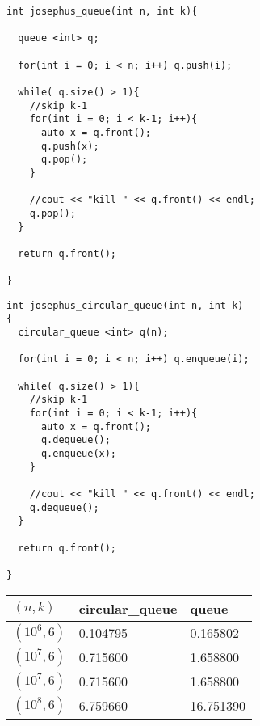 \begin{verbatim}
int josephus_queue(int n, int k){

  queue <int> q;

  for(int i = 0; i < n; i++) q.push(i);

  while( q.size() > 1){
    //skip k-1
    for(int i = 0; i < k-1; i++){
      auto x = q.front();
      q.push(x);
      q.pop();
    }

    //cout << "kill " << q.front() << endl;
    q.pop();
  }  

  return q.front();

}
\end{verbatim}


\begin{verbatim}
int josephus_circular_queue(int n, int k)
{
  circular_queue <int> q(n);

  for(int i = 0; i < n; i++) q.enqueue(i);

  while( q.size() > 1){
    //skip k-1
    for(int i = 0; i < k-1; i++){
      auto x = q.front();
      q.dequeue();
      q.enqueue(x);
    }

    //cout << "kill " << q.front() << endl;
    q.dequeue();
  }  

  return q.front();

}

\end{verbatim}

\begin{center}
\begin{tabular}{lll}
\hline
$(n,k)$ & circular\_queue & queue \\
\hline
$(10^6, 6)$ & 0.104795 & 0.165802\\
$(10^7, 6)$ & 0.715600 & 1.658800\\
$(10^7, 6)$ & 0.715600 & 1.658800\\
$(10^8, 6)$ & 6.759660 & 16.751390\\
  
\end{tabular}
\end{center}



